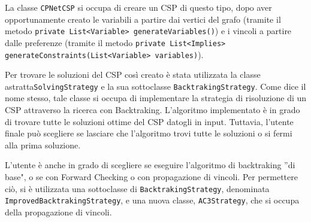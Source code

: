 La classe \texttt{CPNetCSP} si occupa di creare un CSP di questo tipo, dopo aver opportunamente creato le variabili a partire dai vertici del grafo (tramite il metodo \texttt{private List<Variable> generateVariables()}) e i vincoli a partire dalle preferenze (tramite il metodo \texttt{private List<Implies> generateConstraints(List<Variable> variables)}).

Per trovare le soluzioni del CSP così creato è stata utilizzata la classe astratta\texttt{SolvingStrategy} e la sua sottoclasse \texttt{BacktrakingStrategy}. Come dice il nome stesso, tale classe si occupa di implementare la strategia di risoluzione di un CSP attraverso la ricerca con Backtraking. L'algoritmo implementato è in grado di trovare tutte le soluzioni ottime del CSP datogli in input. Tuttavia, l'utente finale può scegliere se lasciare che l'algoritmo trovi tutte le soluzioni o si fermi alla prima soluzione.

L'utente è anche in grado di scegliere se eseguire l'algoritmo di backtraking ''di base", o se con Forward Checking o con propagazione di vincoli. Per permettere ciò, si è utilizzata una sottoclasse di \texttt{BacktrakingStrategy}, denominata \texttt{ImprovedBacktrakingStrategy}, e una nuova classe, \texttt{AC3Strategy}, che si occupa della propagazione di vincoli.


